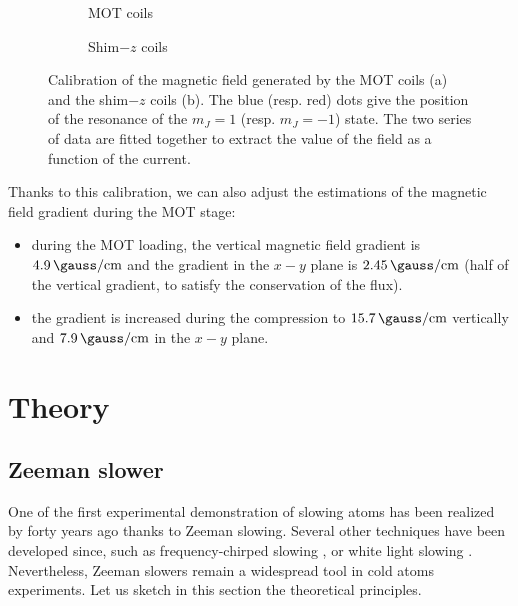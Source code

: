 \documentclass[11pt]{article}
\numberwithin{equation}{section}
\numberwithin{figure}{section}
\begin{document}
%
\begin{figure}[htbp]
	\centering
	\begin{subfigure}[b]{0.48\textwidth}
		\centering
		\small
   		
   		\vspace{-0.4cm}
		\caption{\small MOT coils}
		\label{fig:calibration_MOT}
	\end{subfigure}
	\begin{subfigure}[b]{0.48\textwidth}
    	\centering
    	\small
    			
		\caption{\small Shim$-z$ coils}
		\label{fig:calibration_shim}
	\end{subfigure}	
	\caption{\small Calibration of the magnetic field generated by the MOT coils (a) and the shim$-z$ coils (b). The blue (resp. red) dots give the position of the resonance of the $m_J =1$ (resp. $m_J = -1$) state. The two series of data are fitted together to extract the value of the field as a function of the current.}
    \label{fig:coils}
\end{figure}
%

Thanks to this calibration, we can also adjust the estimations of the magnetic field gradient during the MOT stage:
\begin{itemize}
	\item during the MOT loading, the vertical magnetic field gradient is $\SI{4.9}{\gauss\per\centi\metre}$ and the gradient in the $x-y$ plane is $\SI{2.45}{\gauss\per\centi\metre}$ (half of the vertical gradient, to satisfy the conservation of the flux).
	\item the gradient is increased during the compression to $\SI{15.7}{\gauss\per\centi\metre}$ vertically and $\SI{7.9}{\gauss\per\centi\metre}$ in the $x-y$ plane.
\end{itemize}


\newpage

\section{Theory}
\label{sec:theory}

\subsection{Zeeman slower}
\label{sec:zeeman_theory}

One of the first experimental demonstration of slowing atoms has been realized by \cite{1982_phillips} forty years ago thanks to Zeeman slowing. Several other techniques have been developed since, such as frequency-chirped slowing \citep{1985_ertmer}, or white light slowing \citep{1988_hoffnagle}. Nevertheless, Zeeman slowers remain a widespread tool in cold atoms experiments. Let us sketch in this section the theoretical principles.
\end{document}
